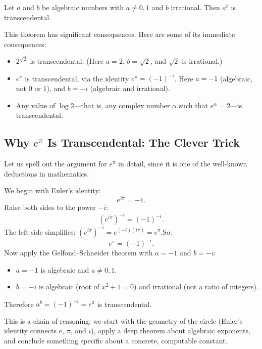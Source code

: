 \begin{theorem}\label{thm:gelfond-schneider}
Let $a$ and $b$ be algebraic numbers with $a \neq 0, 1$ and $b$ irrational. Then $a^b$ is transcendental.
\end{theorem}

This theorem has significant consequences. Here are some of its immediate consequences:

\begin{itemize}
    \item $2^{\sqrt{2}}$ is transcendental. (Here $a = 2$, $b = \sqrt{2}$, and $\sqrt{2}$ is irrational.)
    \item $e^\pi$ is transcendental, via the identity $e^\pi = (-1)^{-i}$. Here $a = -1$ (algebraic, not $0$ or $1$), and $b = -i$ (algebraic and irrational).
    \item Any value of $\log 2$---that is, any complex number $\alpha$ such that $e^\alpha = 2$---is transcendental.
\end{itemize}

\subsection{Why \texorpdfstring{$e^\pi$}{e^pi} Is Transcendental: The Clever Trick}

Let us spell out the argument for $e^\pi$ in detail, since it is one of the well-known deductions in mathematics.

We begin with Euler's identity:
\[
    e^{i\pi} = -1.
\]
Raise both sides to the power $-i$:
\[
    \left(e^{i\pi}\right)^{-i} = (-1)^{-i}.
\]
The left side simplifies: $\left(e^{i\pi}\right)^{-i} = e^{(-i)(i\pi)} = e^{\pi}$.\linebreak[0] So:
\[
    e^\pi = (-1)^{-i}.
\]
Now apply the Gelfond--Schneider theorem with $a = -1$ and $b = -i$:
\begin{itemize}
    \item $a = -1$ is algebraic and $a \neq 0, 1$.
    \item $b = -i$ is algebraic (root of $x^2 + 1 = 0$) and irrational (not a ratio of integers).
\end{itemize}
Therefore $a^b = (-1)^{-i} = e^\pi$ is transcendental.

This is a chain of reasoning: we start with the geometry of the circle (Euler's identity connects $e$, $\pi$, and $i$), apply a deep theorem about algebraic exponents, and conclude something specific about a concrete, computable constant.

